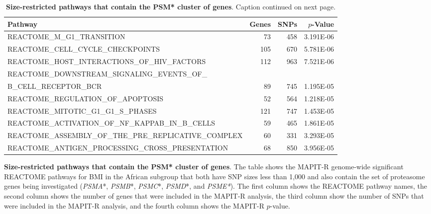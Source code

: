 \documentclass[12pt,a4paper]{article}
\begin{document}
\begin{landscape}
\setlength{\footskip}{2cm}
\begin{table}[ht]
\centering
\begin{tabular}{lrrr}
  \hline
\textbf{Pathway} & \textbf{Genes} & \textbf{SNPs} & \textbf{$p$-Value} \\ 
  \hline
REACTOME\_M\_G1\_TRANSITION & 73 & 458 & 3.191E-06 \\ 
  REACTOME\_CELL\_CYCLE\_CHECKPOINTS & 105 & 670 & 5.781E-06 \\ 
  REACTOME\_HOST\_INTERACTIONS\_OF\_HIV\_FACTORS & 112 & 963 & 7.521E-06 \\ 
  REACTOME\_DOWNSTREAM\_SIGNALING\_EVENTS\_OF\_ & & & \\ 
  \qquad B\_CELL\_RECEPTOR\_BCR & 89 & 745 & 1.195E-05 \\
  REACTOME\_REGULATION\_OF\_APOPTOSIS & 52 & 564 & 1.218E-05 \\ 
  REACTOME\_MITOTIC\_G1\_G1\_S\_PHASES & 121 & 747 & 1.453E-05 \\ 
  REACTOME\_ACTIVATION\_OF\_NF\_KAPPAB\_IN\_B\_CELLS & 59 & 465 & 1.861E-05 \\ 
  REACTOME\_ASSEMBLY\_OF\_THE\_PRE\_REPLICATIVE\_COMPLEX & 60 & 331 & 3.293E-05 \\ 
  REACTOME\_ANTIGEN\_PROCESSING\_CROSS\_PRESENTATION & 68 & 850 & 3.956E-05 \\ 
   \hline
\end{tabular}
  \caption{\textbf{Size-restricted pathways that contain the PSM* cluster of genes}. Caption continued on next page.}
\label{InterPath-Supp-Tables-AllPops-TopGeneCount-SizeRestricted-Proteasome}
\end{table}
\clearpage
\end{landscape}
\setlength{\footskip}{1cm}

\addtocounter{table}{-1}
\begin{table} [t!]
  \caption{\textbf{Size-restricted pathways that contain the PSM* cluster of genes}. The table shows the MAPIT-R genome-wide significant REACTOME pathways for BMI in the African subgroup that both have SNP sizes less than 1,000 and also contain the set of proteasome genes being investigated (\textit{PSMA}*, \textit{PSMB}*, \textit{PSMC}*, \textit{PSMD}*, and \textit{PSME*}). The first column shows the REACTOME pathway names, the second column shows the number of genes that were included in the MAPIT-R analysis, the third column show the number of SNPs that were included in the MAPIT-R analysis, and the fourth column shows the MAPIT-R $p$-value.}
\label{InterPath-Supp-Tables-AllPops-TopGeneCount-SizeRestricted-Proteasome-Caption}
\end{table}
\clearpage
\end{document}
